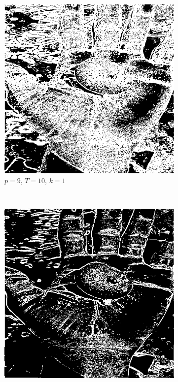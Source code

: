 \documentclass{article}
\begin{document}
\begin{enumerate}[label=(\alph*)]
\begin{figure}
        \begin{subfigure}[b]{0.3\textwidth}
            \includegraphics[width=\textwidth]{img/ED1_9_10_1.png}
            \caption{$p = 9$, $T = 10$, $k = 1$}
        \end{subfigure}
        ~
        \begin{subfigure}[b]{0.3\textwidth}
            \includegraphics[width=\textwidth]{img/ED1_9_30_1.png}

\end{subfigure}
\end{figure}
\end{enumerate}
\end{document}
